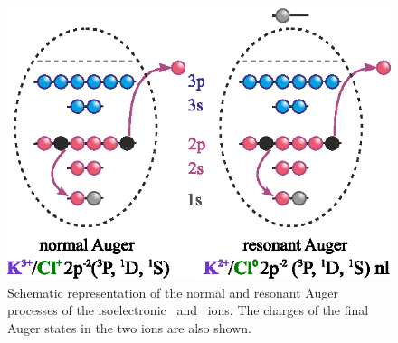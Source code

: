 \begin{figure}
\includegraphics{figures/auger_process.eps}
\caption{Schematic representation of the normal and resonant Auger processes of the isoelectronic \ki~and \cli~ions. The charges of the final Auger states in the two ions are also shown.}
\label{fg:auger}
\end{figure}